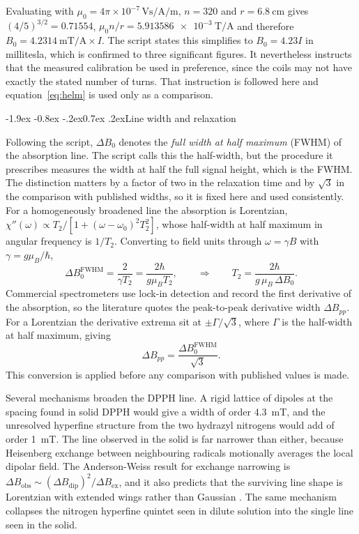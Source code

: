 \documentclass[11pt,a4paper]{article}
\makeatletter
\renewcommand\subsection{\@startsection{subsection}{2}{\z@}%
  {-1.9ex \@plus -0.8ex \@minus -.2ex}{0.7ex \@plus .2ex}{\normalfont\normalsize\bfseries}}
\makeatother
\begin{document}
Evaluating with $\mu_0 = 4\pi\times10^{-7}\,\si{\volt\second\per\ampere\per\metre}$, $n = 320$ and
$r = \SI{6.8}{\centi\metre}$ gives $(4/5)^{3/2} = 0.71554$,
$\mu_0 n/r = \SI{5.913586e-3}{\tesla\per\ampere}$ and therefore
$B_0 = \SI{4.2314}{\milli\tesla\per\ampere}\times I$. The script states this simplifies to
$B_0 = 4.23I$ in millitesla, which is confirmed to three significant figures. It nevertheless
instructs that the measured calibration be used in preference, since the coils may not have
exactly the stated number of turns. That instruction is followed here and
equation~\eqref{eq:helm} is used only as a comparison.

\subsection{Line width and relaxation}
\label{sec:theorywidth}

Following the script, $\Delta B_0$ denotes the \emph{full width at half maximum} (FWHM) of the
absorption line. The script calls this the half-width, but the procedure it prescribes measures the
width at half the full signal height, which is the FWHM. The distinction matters by a factor of two
in the relaxation time and by $\sqrt{3}$ in the comparison with published widths, so it is fixed
here and used consistently. For a homogeneously broadened line the absorption is Lorentzian,
$\chi''(\omega) \propto T_2/[1 + (\omega-\omega_0)^{2}T_2^{2}]$, whose half-width at half maximum
in angular frequency is $1/T_2$. Converting to field units through $\omega = \gamma B$ with
$\gamma = g\mu_B/\hbar$,
\begin{equation}
\Delta B_0^{\mathrm{FWHM}} = \frac{2}{\gamma T_2} = \frac{2\hbar}{g\mu_B T_2} ,
\qquad\Longrightarrow\qquad
T_2 = \frac{2\hbar}{g\,\mu_B\,\Delta B_0} .
\label{eq:t2}
\end{equation}
Commercial spectrometers use lock-in detection and record the first derivative of the absorption,
so the literature quotes the peak-to-peak derivative width $\Delta B_{pp}$. For a Lorentzian the
derivative extrema sit at $\pm\Gamma/\sqrt{3}$, where $\Gamma$ is the half-width at half maximum,
giving
\begin{equation}
\Delta B_{pp} = \frac{\Delta B_0^{\mathrm{FWHM}}}{\sqrt{3}} .
\label{eq:pp}
\end{equation}
This conversion is applied before any comparison with published values is made.

Several mechanisms broaden the DPPH line. A rigid lattice of dipoles at the spacing found in solid
DPPH would give a width of order \SI{4.3}{\milli\tesla}, and the unresolved hyperfine structure
from the two hydrazyl nitrogens would add of order \SI{1}{\milli\tesla}. The line observed in the
solid is far narrower than either, because Heisenberg exchange between neighbouring radicals
motionally averages the local dipolar field. The Anderson-Weiss result for exchange narrowing is
$\Delta B_{\mathrm{obs}} \sim (\Delta B_{\mathrm{dip}})^{2}/\Delta B_{\mathrm{ex}}$, and it also
predicts that the surviving line shape is Lorentzian with extended wings rather than Gaussian
\cite{anderson}. The same mechanism collapses the nitrogen hyperfine quintet seen in dilute
solution into the single line seen in the solid.
\end{document}
